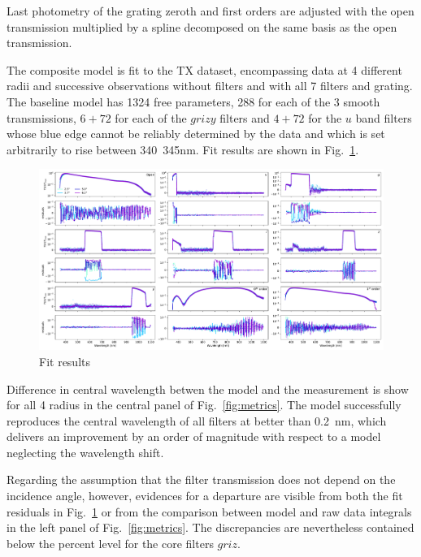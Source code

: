Last photometry of the grating zeroth and first orders are adjusted
with the open transmission multiplied by a spline decomposed on
the same basis as the open transmission.

The composite model is fit to the TX dataset, encompassing data at 4
different radii and successive observations without filters and with
all 7 filters and grating. The baseline model has 1324 free
parameters, \num{288} for each of the 3 smooth transmissions,
$6+72$ for each of the $grizy$ filters and $4+72$ for the $u$ band
filters whose blue edge cannot be reliably determined by the data and
which is set arbitrarily to rise between \SI{340}{345}{nm}. Fit
results are shown in Fig.~\ref{fig:lambdathetafitresults}.

\begin{figure}
  \centering
  \includegraphics[width=1\linewidth]{./fig/lambdathetafitresults.pdf}
  \caption{Fit results}
  \label{fig:lambdathetafitresults}
\end{figure}

Difference in central wavelength betwen the model and the measurement
is show for all 4 radius in the central panel of
Fig.~\ref{fig:metrics}. The model successfully reproduces the central
wavelength of all filters at better than \SI{0.2}{nm}, which delivers
an improvement by an order of magnitude with respect to a model
neglecting the wavelength shift.

Regarding the assumption that the filter transmission does not depend
on the incidence angle, however, evidences for a departure are visible
from both the fit residuals in Fig.~\ref{fig:lambdathetafitresults} or
from the comparison between model and raw data integrals in the left
panel of Fig.~\ref{fig:metrics}. The discrepancies are nevertheless
contained below the percent level for the core filters $griz$.

